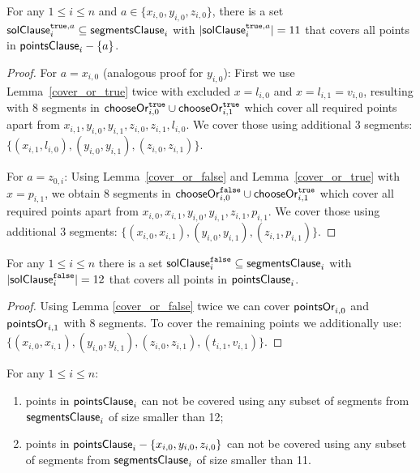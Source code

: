 \begin{lemma}
\label{cover_clauses_solution_true}
For any $1 \le i \le n$ and $a \in \{ x_{i, 0}, y_{i, 0}, z_{i, 0}\}$,
there is a set $\mathsf{solClause}^{\texttt{true},a}_i \subseteq \mathsf{segmentsClause}_i$
with $|\mathsf{solClause}^{\texttt{true},a}_i| = 11$
that covers all points in $\mathsf{pointsClause}_{i} - \{a\}$.
\end{lemma}

\begin{proof}
For $a = x_{i, 0}$ (analogous proof for $y_{i, 0}$):
First we use Lemma~\ref{cover_or_true} twice with excluded $x = l_{i, 0}$ and
$x = l_{i, 1} = v_{i, 0}$,
resulting with 8 segments in $\mathsf{chooseOr}^{\texttt{true}}_{i,0} \cup \mathsf{chooseOr}^{\texttt{true}}_{i,1}$
which cover all required points apart from
$x_{i, 1}, y_{i, 0}, y_{i, 1}, z_{i, 0}, z_{i, 1}, l_{i, 0}$.
We cover those using additional 3 segments:
$\{ (x_{i, 1}, l_{i, 0}), (y_{i, 0}, y_{i, 1}),
(z_{i, 0}, z_{i, 1}) \}$.

For $a = z_{0, i}$:
Using Lemma~\ref{cover_or_false} and Lemma~\ref{cover_or_true} with
$x = p_{i, 1}$,
we obtain 8 segments in $\mathsf{chooseOr}^{\texttt{false}}_{i,0} \cup \mathsf{chooseOr}^{\texttt{true}}_{i,1}$
which cover all required points apart from
$x_{i, 0}, x_{i, 1}, y_{i, 0}, y_{i, 1}, z_{i, 1}, p_{i, 1}$.
We cover those using additional 3 segments:
$\{ (x_{i, 0}, x_{i, 1}), (y_{i, 0}, y_{i, 1}),
(z_{i, 1}, p_{i, 1}) \}$.
\end{proof}

\begin{lemma}
\label{cover_clauses_solution_false}
For any $1 \le i \le n$ there is
a set $\mathsf{solClause}^{\texttt{false}}_i \subseteq \mathsf{segmentsClause}_i$
with $|\mathsf{solClause}^{\texttt{false}}_i| = 12$
that covers all points in $\mathsf{pointsClause}_{i}$.
\end{lemma}

\begin{proof}
Using Lemma \ref{cover_or_false} twice we can
cover $\mathsf{pointsOr}_{i,0}$ and  $\mathsf{pointsOr}_{i,1}$
with 8 segments.
To cover the remaining points we additionally use:
$\{ (x_{i, 0}, x_{i, 1}), (y_{i, 0}, y_{i, 1}),
(z_{i, 0}, z_{i, 1}), (t_{i, 1}, v_{i, 1}) \}.$
\end{proof}

\begin{lemma}
\label{cover_clauses_segments_no_less}
For any $1 \le i \le n$:
\begin{enumerate}[label={(\arabic*)}]
	\item points in $\mathsf{pointsClause}_{i}$ can not be covered 
	using any subset of segments
	from $\mathsf{segmentsClause}_i$ of size smaller than 12;
	\item points in $\mathsf{pointsClause}_{i} - \{ x_{i, 0}, y_{i, 0}, z_{i, 0}\}$
	can not be covered using any subset of segments
	from $\mathsf{segmentsClause}_i$ of size smaller than 11.
\end{enumerate}
\end{lemma}


